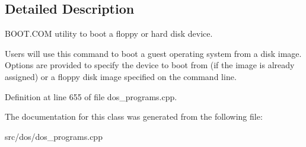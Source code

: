 \subsection{Detailed Description}
B\-O\-O\-T.\-C\-O\-M utility to boot a floppy or hard disk device. 

Users will use this command to boot a guest operating system from a disk image. Options are provided to specify the device to boot from (if the image is already assigned) or a floppy disk image specified on the command line. 

Definition at line 655 of file dos\-\_\-programs.\-cpp.



The documentation for this class was generated from the following file\-:\begin{DoxyCompactItemize}
\item 
src/dos/dos\-\_\-programs.\-cpp\end{DoxyCompactItemize}
